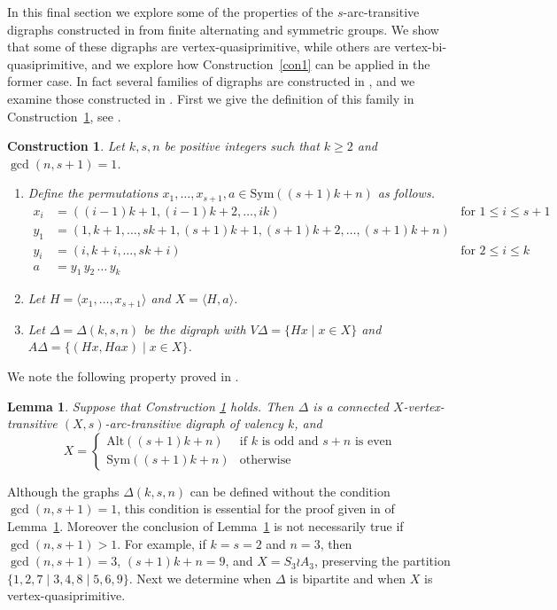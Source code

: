 \documentclass[11pt]{amsart}
\newtheorem{lemma}[theorem]{Lemma}
\newtheorem{construction}[theorem]{Construction}
\newcommand{\Sym}{\mathrm{Sym}}
\newcommand{\Alt}{\mathrm{Alt}}
\begin{document}
In this final section we explore some of the properties of the $s$-arc-transitive digraphs constructed in \cite{CLP} from finite alternating and symmetric groups. We show that some of these digraphs are vertex-quasiprimitive, while others are vertex-bi-quasiprimitive, and we explore how Construction~\ref{con1} can be applied in the former case. In fact several families of digraphs are constructed in \cite{CLP}, and we examine  those constructed in \cite[Proof of Theorem 1]{CLP}.  First we give the definition of this family in Construction~\ref{ex: alt and sym}, see \cite[pp 66-67]{CLP}.



\begin{construction}\label{ex: alt and sym}%
Let $k, s, n$ be positive integers such that $k\geqslant2$ and $\gcd(n,s+1)=1$. 
\begin{enumerate}
\item[(a)] Define the permutations $x_1,\dots,x_{s+1},a\in \Sym((s+1)k+n)$ as follows.
\begin{align*}
    x_{i}&= ((i-1)k+1,(i-1)k+2,\ldots, ik) & \mbox{for  \(1\leqslant i\leqslant s+1\)}\\
    y_1&= (1,k+1,\ldots, sk+1,(s+1)k+1, (s+1)k+2, \ldots,(s+1)k+n) & \\
    y_i &= (i,k+i,\ldots,sk+i) & \mbox{for  \(2\leqslant i\leqslant k\)}\\
    a&= y_1\,y_2\,\dots \,y_k  & 
\end{align*}

\item[(b)] 
Let \(H=\langle x_1,\ldots,x_{s+1}\rangle\) and \(X=\langle H,a\rangle\).

\item[(c)] Let  \(\Delta=\Delta(k,s,n)\) be the digraph with \(V\Delta=\{Hx\mid x\in X\}\) and \(A\Delta=\{(Hx,Hax)\mid x \in X\}\). 
\end{enumerate}
    
\end{construction}

We note the following property proved in \cite{CLP}.

\begin{lemma}\cite[pp 66-67]{CLP}\label{ex: alt and sym 1}
    Suppose that Construction \ref{ex: alt and sym} holds. Then \(\Delta\) is a connected \(X\)-vertex-transitive \((X,s)\)-arc-transitive digraph of valency \(k\), and 
    \[
    X=\begin{cases}
    \Alt((s+1)k+n)&\text{if \(k\) is odd and \(s+n\) is even}\\
    \Sym((s+1)k+n)&\text{otherwise}
\end{cases}
\]
\end{lemma}
Although the graphs $\Delta(k,s,n)$ can be defined without the condition $\gcd(n,s+1)=1$, this condition is essential for the proof given in \cite[Proof of Theorem 1]{CLP} of Lemma~\ref{ex: alt and sym 1}. Moreover the conclusion of Lemma~\ref{ex: alt and sym 1} is not necessarily true if $\gcd(n,s+1)>1$. For example, if $k=s=2$ and $n=3$, then  $\gcd(n,s+1)=3$,  $(s+1)k+n=9$, and $X= S_3\wr A_3$, preserving the partition $\{1,2,7\mid 3,4,8\mid 5,6,9\}$. 
Next we determine when $\Delta$ is bipartite and when $X$ is vertex-quasiprimitive.
\end{document}
